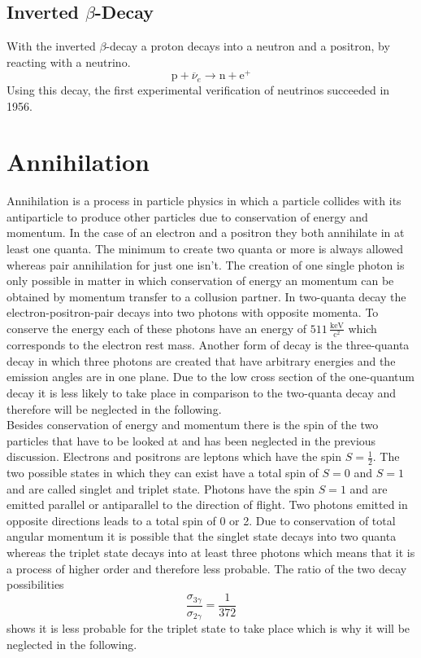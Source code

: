 \subsection{Inverted $\beta$-Decay}
With the inverted $\beta$-decay a proton decays into a neutron and a positron, by reacting with a neutrino.
$${\displaystyle \mathrm {p} +{\overline {\nu }}_{e}\to \mathrm {n} +\mathrm {e} ^{+}}$$
Using this decay, the first experimental verification of neutrinos succeeded in 1956.
\section{Annihilation}
Annihilation is a process in particle physics in which a particle collides with its antiparticle to produce other particles due to conservation of energy and momentum. In the case of an electron and a positron they both annihilate in at least one quanta. The minimum to create two quanta or more is always allowed whereas pair annihilation for just one isn't. The creation of one single photon is only possible in matter in which conservation of energy an momentum can be obtained by momentum transfer to a collusion partner. In two-quanta decay the electron-positron-pair decays into two photons with opposite momenta. To conserve the energy each of these photons have an energy of $511\,\frac{\text{keV}}{\text{c}^2}$ which corresponds to the electron rest mass. Another form of decay is the three-quanta decay in which three photons are created that have arbitrary energies and the emission angles are in one plane. Due to the low cross section of the one-quantum decay it is less likely to take place in comparison to the two-quanta decay and therefore will be neglected in the following. \\
Besides conservation of energy and momentum there is the spin of the two particles that have to be looked at and has been neglected in the previous discussion. Electrons and positrons are leptons which have the spin $S=\frac{1}{2}$. The two possible states in which they can exist have a total spin of $S=0$ and $S=1$ and are called singlet and triplet state. Photons have the spin $S=1$ and are emitted parallel or antiparallel to the direction of flight. Two photons emitted in opposite directions leads to a total spin of 0 or 2. Due to conservation of total angular momentum it is possible that the singlet state decays into two quanta whereas the triplet state decays into at least three photons which means that it is a process of higher order and therefore less probable. The ratio of the two decay possibilities
\begin{equation}
    \frac{\sigma_{3\gamma}}{\sigma_{2\gamma}}=\frac{1}{372}
    \label{ration decay}
\end{equation} shows it is less probable for the triplet state to take place which is why it will be neglected in the following.



